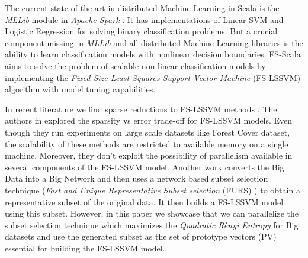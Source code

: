 The current state of the art in distributed Machine Learning in Scala is the \textit{MLLib} module in \textit{Apache Spark} \cite{Meng}. It has implementations of Linear SVM and Logistic Regression for solving binary classification problems. But a crucial component missing in \textit{MLLib} and all distributed Machine Learning libraries is the ability to learn classification models with nonlinear decision boundaries. FS-Scala aims to solve the problem of scalable non-linear classification models by implementing the \textit{Fixed-Size Least Squares Support Vector Machine} (FS-LSSVM) algorithm \cite{DeBrabanter2010,Suykens2002} with model tuning capabilities.  

In recent literature we find sparse reductions to FS-LSSVM methods \cite{Mall2015,Mall2013}. The authors in \cite{Mall2015,Mall2013} explored the sparsity vs error trade-off for FS-LSSVM models. Even though they run experiments on large scale datasets like Forest Cover dataset, the scalability of these methods are restricted to available memory on a single machine. Moreover, they don't exploit the possibility of parallelism available in several components of the FS-LSSVM model. Another work \cite{Mall2014} converts the Big Data into a Big Network and then uses a network based subset selection technique (\textit{Fast and Unique Representative Subset selection} (FURS) \cite{Mall2013FURS}) to obtain a representative subset of the original data. It then builds a FS-LSSVM model using this subset. However, in this paper we showcase that we can parallelize the subset selection technique which maximizes the \textit{Quadratic R\`enyi Entropy} for Big datasets and use the generated subset as the set of prototype vectors (PV) essential for building the FS-LSSVM model.

